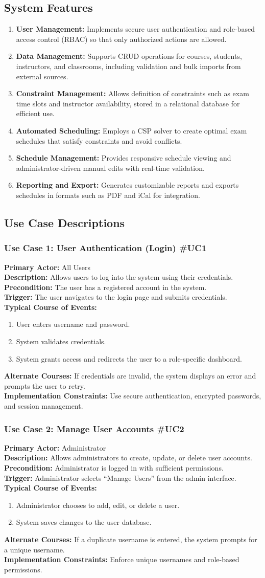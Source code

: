 \documentclass[11pt]{report}
\newcommand{\usecase}[8]{%
\subsubsection*{#1}
\textbf{Primary Actor:} #2\\
\textbf{Description:} #3\\
\textbf{Precondition:} #4\\
\textbf{Trigger:} #5\\
\textbf{Typical Course of Events:}
\begin{enumerate}
#6
\end{enumerate}
\textbf{Alternate Courses:} #7\\
\textbf{Implementation Constraints:} #8
}
\begin{document}
\subsection{System Features}
\begin{enumerate}
\item \textbf{User Management:} Implements secure user authentication and role-based access control (RBAC) so that only authorized actions are allowed.
\item \textbf{Data Management:} Supports CRUD operations for courses, students, instructors, and classrooms, including validation and bulk imports from external sources.
\item \textbf{Constraint Management:} Allows definition of constraints such as exam time slots and instructor availability, stored in a relational database for efficient use.
\item \textbf{Automated Scheduling:} Employs a CSP solver to create optimal exam schedules that satisfy constraints and avoid conflicts.
\item \textbf{Schedule Management:} Provides responsive schedule viewing and administrator-driven manual edits with real-time validation.
\item \textbf{Reporting and Export:} Generates customizable reports and exports schedules in formats such as PDF and iCal for integration.
\end{enumerate}

\subsection{Use Case Descriptions}

\usecase{Use Case 1: User Authentication (Login) \#UC1}{All Users}{Allows users to log into the system using their credentials.}{The user has a registered account in the system.}{The user navigates to the login page and submits credentials.}{\item User enters username and password.\item System validates credentials.\item System grants access and redirects the user to a role-specific dashboard.}{If credentials are invalid, the system displays an error and prompts the user to retry.}{Use secure authentication, encrypted passwords, and session management.}

\usecase{Use Case 2: Manage User Accounts \#UC2}{Administrator}{Allows administrators to create, update, or delete user accounts.}{Administrator is logged in with sufficient permissions.}{Administrator selects \textquotedblleft Manage Users\textquotedblright{} from the admin interface.}{\item Administrator chooses to add, edit, or delete a user.\item System saves changes to the user database.}{If a duplicate username is entered, the system prompts for a unique username.}{Enforce unique usernames and role-based permissions.}
\end{document}
